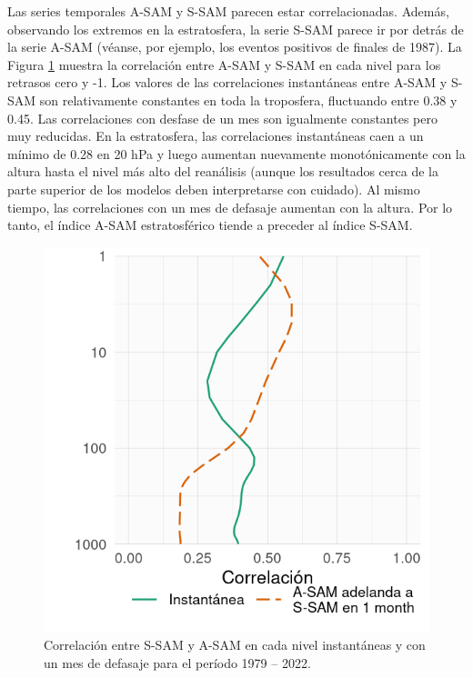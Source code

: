 \documentclass[12pt,oneside]{reedthesis}
\begin{document}
Las series temporales A-SAM y S-SAM parecen estar correlacionadas.
Además, observando los extremos en la estratosfera, la serie S-SAM parece ir por detrás de la serie A-SAM (véanse, por ejemplo, los eventos positivos de finales de 1987).
La Figura \ref{fig:cor-lev} muestra la correlación entre A-SAM y S-SAM en cada nivel para los retrasos cero y -1.
Los valores de las correlaciones instantáneas entre A-SAM y S-SAM son relativamente constantes en toda la troposfera, fluctuando entre 0.38 y 0.45.
Las correlaciones con desfase de un mes son igualmente constantes pero muy reducidas.
En la estratosfera, las correlaciones instantáneas caen a un mínimo de 0.28 en 20 hPa y luego aumentan nuevamente monotónicamente con la altura hasta el nivel más alto del reanálisis (aunque los resultados cerca de la parte superior de los modelos deben interpretarse con cuidado).
Al mismo tiempo, las correlaciones con un mes de defasaje aumentan con la altura.
Por lo tanto, el índice A-SAM estratosférico tiende a preceder al índice S-SAM.



\begin{figure}
\includegraphics{figures/30-sam/cor-lev-1} \caption{Correlación entre S-SAM y A-SAM en cada nivel instantáneas y con un mes de defasaje para el período 1979 -- 2022.}\label{fig:cor-lev}
\end{figure}
\end{document}
